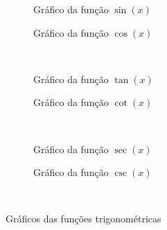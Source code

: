 \begin{figure}
  \centering
  \begin{subfigure}[b]{0.5\linewidth}
    \centering
    
    \caption{Gráfico da função $\sin(x)$}
    \label{fig:functions_sin}
  \end{subfigure}%
  \begin{subfigure}[b]{0.5\linewidth}
    \centering
    
    \caption{Gráfico da função $\cos(x)$}
    \label{fig:functions_cos}
  \end{subfigure}\\[0.5\baselineskip]
  \begin{subfigure}[b]{0.5\linewidth}
    \centering
    
    \caption{Gráfico da função $\tan(x)$}
    \label{fig:functions_tan}
  \end{subfigure}%
  \begin{subfigure}[b]{0.5\linewidth}
    \centering
    
    \caption{Gráfico da função $\cot(x)$}
    \label{fig:functions_cot}
  \end{subfigure}\\[0.5\baselineskip]
  \begin{subfigure}[b]{0.5\linewidth}
    \centering
    
    \caption{Gráfico da função $\sec(x)$}
    \label{fig:functions_sec}
  \end{subfigure}%
  \begin{subfigure}[b]{0.5\linewidth}
    \centering
    
    \caption{Gráfico da função $\csc(x)$}
    \label{fig:functions_csc}
  \end{subfigure}\\[0.5\baselineskip]
  \caption{Gráficos das funções trigonométricas}
  \label{fig:functions_trig}
\end{figure}

